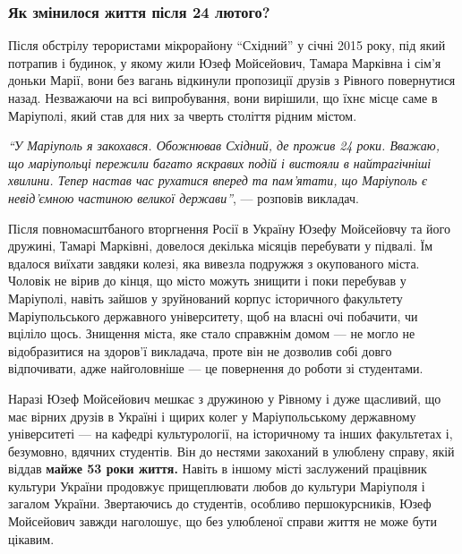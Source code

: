 
\subsubsection{Як змінилося життя після 24 лютого?}

Після обстрілу терористами мікрорайону \enquote{Східний} у січні 2015 року, під який
потрапив і будинок, у якому жили Юзеф Мойсейович, Тамара Марківна і сім'я
доньки Марії, вони без вагань відкинули пропозиції друзів з Рівного повернутися
назад. Незважаючи на всі випробування, вони вирішили, що їхнє місце саме в
Маріуполі, який став для них за чверть століття рідним містом.

\begin{leftbar}
\emph{\enquote{У Маріуполь я закохався. Обожнював Східний, де прожив 24 роки. Вважаю, що
маріупольці пережили багато яскравих подій і вистояли в найтрагічніші хвилини.
Тепер настав час рухатися вперед та пам'ятати, що Маріуполь є невід'ємною
частиною великої держави}}, — розповів викладач.
\end{leftbar}


Після повномасштбаного вторгнення Росії в Україну Юзефу Мойсейовчу та його
дружині, Тамарі Марківні, довелося декілька місяців перебувати у підвалі. Їм
вдалося виїхати завдяки колезі, яка вивезла подружжя з окупованого міста.
Чоловік не вірив до кінця, що місто можуть знищити і поки перебував у
Маріуполі, навіть зайшов у зруйнований корпус історичного факультету
Маріупольського державного університету, щоб на власні очі побачити, чи вціліло
щось. Знищення міста, яке стало справжнім домом — не могло не відобразитися на
здоров'ї викладача, проте він не дозволив собі довго відпочивати, адже
найголовніше — це повернення до роботи зі студентами.

Наразі Юзеф Мойсейович мешкає з дружиною у Рівному і дуже щасливий, що має
вірних друзів в Україні і щирих колег у Маріупольському державному університеті
— на кафедрі культурології, на історичному та інших факультетах і, безумовно,
вдячних студентів. Він до нестями закоханий в улюблену справу, якій віддав
\textbf{майже 53 роки життя.} Навіть в іншому місті заслужений працівник культури
України продовжує прищеплювати любов до культури Маріуполя і загалом України.
Звертаючись до студентів, особливо першокурсників, Юзеф Мойсейович завжди
наголошує, що без улюбленої справи життя не може бути цікавим.

